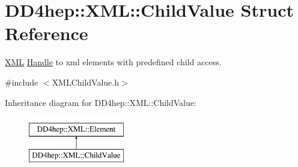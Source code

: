 \hypertarget{struct_d_d4hep_1_1_x_m_l_1_1_child_value}{}\section{D\+D4hep\+:\+:X\+ML\+:\+:Child\+Value Struct Reference}
\label{struct_d_d4hep_1_1_x_m_l_1_1_child_value}


\hyperlink{namespace_d_d4hep_1_1_x_m_l}{X\+ML} \hyperlink{class_d_d4hep_1_1_handle}{Handle} to xml elements with predefined child access.  




{\ttfamily \#include $<$X\+M\+L\+Child\+Value.\+h$>$}

Inheritance diagram for D\+D4hep\+:\+:X\+ML\+:\+:Child\+Value\+:\begin{figure}[H]
\begin{center}
\leavevmode
\includegraphics[height=2.000000cm]{struct_d_d4hep_1_1_x_m_l_1_1_child_value}
\end{center}
\end{figure}
